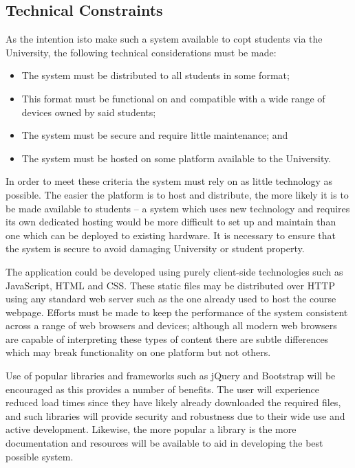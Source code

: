 \documentclass[bsc,twoside,singlespacing,parskip,logo,notimes,normalheadings]{infthesis}
\begin{document}
        \subsection{Technical Constraints}
        As the intention isto make such a system available to
        \gls{copt} students via the University, the following
        technical considerations must be made:

        \begin{itemize}
        \item The system must be distributed to all students in some format;
        \item This format must be functional on and compatible with a
          wide range of devices owned by said students;
        \item The system must be secure and require little
          maintenance; and
        \item The system must be hosted on some platform available to
          the University.
        \end{itemize}

        In order to meet these criteria the system must rely on as
        little technology as possible. The easier the platform is to
        host and distribute, the more likely it is to be made
        available to students -- a system which uses new technology
        and requires its own dedicated hosting would be more difficult
        to set up and maintain than one which can be deployed to
        existing hardware. It is necessary to ensure that the system
        is secure to avoid damaging University or student property.

        The application could be developed using purely client-side
        technologies such as JavaScript, HTML and CSS. These static
        files may be distributed over HTTP using any standard web
        server such as the one already used to host the course
        webpage. Efforts must be made to keep the performance of the
        system consistent across a range of web browsers and devices;
        although all modern web browsers are capable of interpreting
        these types of content there are subtle differences which may
        break functionality on one platform but not others.

        Use of popular libraries and frameworks such as jQuery and
        Bootstrap will be encouraged as this provides a number of
        benefits. The user will experience reduced load times since
        they have likely already downloaded the required files, and
        such libraries will provide security and robustness due to
        their wide use and active development. Likewise, the more
        popular a library is the more documentation and resources will
        be available to aid in developing the best possible system.
        
\end{document}
